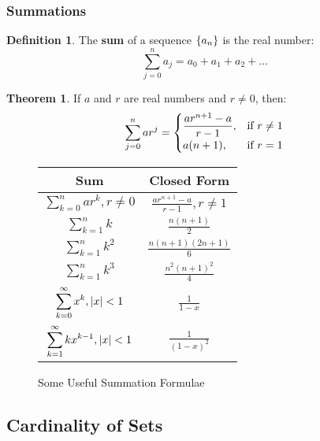 \documentclass[article, 11pt]{article}
\theoremstyle{definition}
\newtheorem{theorem}{Theorem}[subsubsection]
\newtheorem{definition}{Definition}[subsubsection]
\DeclarePairedDelimiter\abs{\lvert}{\rvert} %
\newcommand{\df}{\displaystyle\frac} %
\DeclarePairedDelimiter\set{\{}{\}}
\begin{document}
    \subsubsection{Summations}
    \begin{definition}
        The \textbf{sum} of a sequence $\set*{a_n}$ is the real number:
        \begin{equation*}
            \sum_{j=0}^{n} a_j = a_0 + a_1 + a_2 + \dots
        \end{equation*}
    \end{definition}
    \begin{theorem}
        If $a$ and $r$ are real numbers and $r \neq 0$, then:
        \begin{equation*}
            \sum_{j=0}^{n} ar^j = \begin{cases}
                                    \df{ar^{n+1} - a}{r-1}, & \text{if } r \neq 1 \cr a(n+1), & \text{if } r = 1
                                  \end{cases}
        \end{equation*}
    \end{theorem}
    \begin{figure}[H]
        \centering
        {\renewcommand{\arraystretch}{2}
        \begin{tabular}{|c|c|}
            \hline
            Sum & Closed Form \\
            \hline
            $\displaystyle\sum_{k=0}^{n}ar^k, r \neq 0$ & $\df{ar^{n+1}-a}{r-1}, r \neq 1$ \\
            $\displaystyle\sum_{k=1}^n k$               & $\df{n(n+1)}{2}$ \\
            $\displaystyle\sum_{k=1}^n k^2$             & $\df{n(n+1)(2n+1)}{6}$ \\
            $\displaystyle\sum_{k=1}^n k^3$             & $\df{n^2(n+1)^2}{4}$ \\
            $\displaystyle\sum_{k=0}^{\infty}x^k, \abs*{x} < 1$ & $\df{1}{1-x}$ \\
            $\displaystyle\sum_{k=1}^{\infty}kx^{k-1}, \abs*{x} < 1$ & $\df{1}{(1-x)^2}$ \\
            \hline
        \end{tabular}}
        \caption{Some Useful Summation Formulae}
    \end{figure}
    \subsection{Cardinality of Sets}
\end{document}
